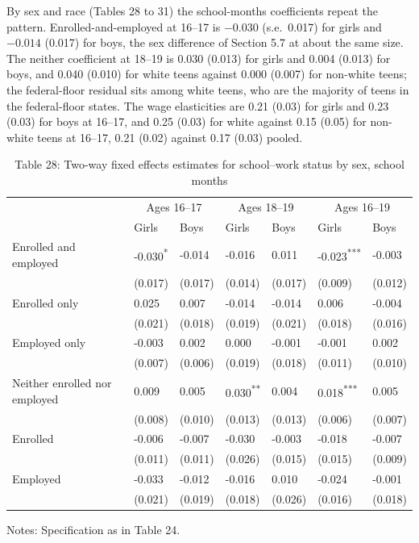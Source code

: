 \documentclass[12pt]{article}
\begin{document}
By sex and race (Tables 28 to 31) the school-months coefficients repeat the pattern. Enrolled-and-employed at 16--17 is $-0.030$ (s.e.\ 0.017) for girls and $-0.014$ (0.017) for boys, the sex difference of Section 5.7 at about the same size. The neither coefficient at 18--19 is 0.030 (0.013) for girls and 0.004 (0.013) for boys, and 0.040 (0.010) for white teens against 0.000 (0.007) for non-white teens; the federal-floor residual sits among white teens, who are the majority of teens in the federal-floor states. The wage elasticities are 0.21 (0.03) for girls and 0.23 (0.03) for boys at 16--17, and 0.25 (0.03) for white against 0.15 (0.05) for non-white teens at 16--17, 0.21 (0.02) against 0.17 (0.03) pooled.

\begin{table}
\centering
\caption{Table 28: Two-way fixed effects estimates for school--work status by sex, school months}

\small
\begin{tabular}{p{}p{}p{}p{}p{}p{}p{}}
\toprule
 & \multicolumn{2}{c}{Ages 16--17} & \multicolumn{2}{c}{Ages 18--19} & \multicolumn{2}{c}{Ages 16--19} \\

 & Girls & Boys & Girls & Boys & Girls & Boys \\
\midrule
Enrolled and employed & -0.030\textsuperscript{*} & -0.014 & -0.016 & 0.011 & -0.023\textsuperscript{***} & -0.003 \\
 & (0.017) & (0.017) & (0.014) & (0.017) & (0.009) & (0.012) \\
Enrolled only & 0.025 & 0.007 & -0.014 & -0.014 & 0.006 & -0.004 \\
 & (0.021) & (0.018) & (0.019) & (0.021) & (0.018) & (0.016) \\
Employed only & -0.003 & 0.002 & 0.000 & -0.001 & -0.001 & 0.002 \\
 & (0.007) & (0.006) & (0.019) & (0.018) & (0.011) & (0.010) \\
Neither enrolled nor employed & 0.009 & 0.005 & 0.030\textsuperscript{**} & 0.004 & 0.018\textsuperscript{***} & 0.005 \\
 & (0.008) & (0.010) & (0.013) & (0.013) & (0.006) & (0.007) \\
Enrolled & -0.006 & -0.007 & -0.030 & -0.003 & -0.018 & -0.007 \\
 & (0.011) & (0.011) & (0.026) & (0.015) & (0.015) & (0.009) \\
Employed & -0.033 & -0.012 & -0.016 & 0.010 & -0.024 & -0.001 \\
 & (0.021) & (0.019) & (0.018) & (0.026) & (0.016) & (0.018) \\
\bottomrule
\end{tabular}



\noindent\small Notes: Specification as in Table 24.

\end{table}
\end{document}
